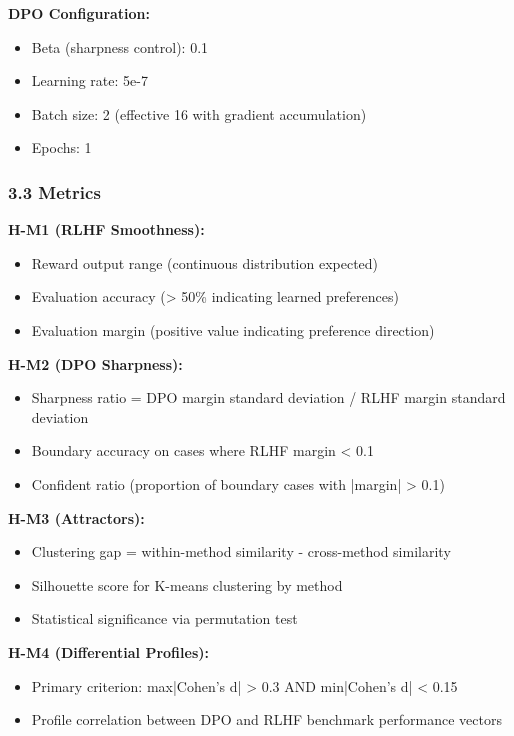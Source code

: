 \textbf{DPO Configuration:}
\begin{itemize}
\item Beta (sharpness control): 0.1
\item Learning rate: 5e-7
\item Batch size: 2 (effective 16 with gradient accumulation)
\item Epochs: 1
\end{itemize}

\subsubsection{3.3 Metrics}

\textbf{H-M1 (RLHF Smoothness):}
\begin{itemize}
\item Reward output range (continuous distribution expected)
\item Evaluation accuracy (> 50\% indicating learned preferences)
\item Evaluation margin (positive value indicating preference direction)
\end{itemize}

\textbf{H-M2 (DPO Sharpness):}
\begin{itemize}
\item Sharpness ratio = DPO margin standard deviation / RLHF margin standard deviation
\item Boundary accuracy on cases where RLHF margin < 0.1
\item Confident ratio (proportion of boundary cases with |margin| > 0.1)
\end{itemize}

\textbf{H-M3 (Attractors):}
\begin{itemize}
\item Clustering gap = within-method similarity - cross-method similarity
\item Silhouette score for K-means clustering by method
\item Statistical significance via permutation test
\end{itemize}

\textbf{H-M4 (Differential Profiles):}
\begin{itemize}
\item Primary criterion: max|Cohen's d| > 0.3 AND min|Cohen's d| < 0.15
\item Profile correlation between DPO and RLHF benchmark performance vectors
\end{itemize}

